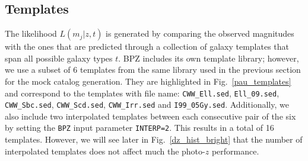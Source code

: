 \subsection{Templates}
The likelihood $L(m_j|z,t)$ is generated by comparing the observed magnitudes with the ones that are predicted through a collection of galaxy templates that span all possible galaxy types $t$. BPZ includes its own template library; however, we use a subset of 6 templates from the same library used in the previous section for the mock catalog generation. They are highlighted in Fig.~\ref{pau_templates} and correspond to the templates with file name: \texttt{CWW\_Ell.sed}, \texttt{Ell\_09.sed}, \texttt{CWW\_Sbc.sed}, \texttt{CWW\_Scd.sed}, \texttt{CWW\_Irr.sed} and \texttt{I99\_05Gy.sed}. Additionally, we also include two interpolated templates between each consecutive pair of the six by setting the \texttt{BPZ} input parameter \texttt{INTERP=2}. This results in a total of 16 templates. However, we will see later in Fig.~\ref{dz_hist_bright} that the number of interpolated templates does not affect much the photo-$z$ performance.

